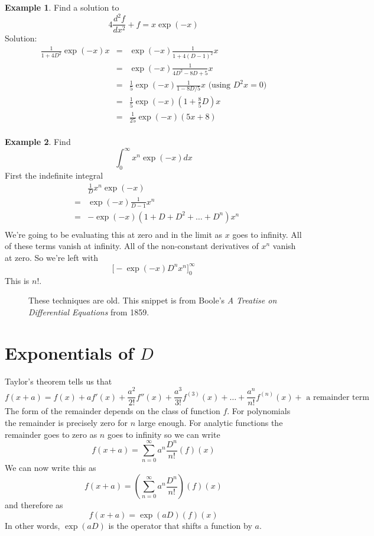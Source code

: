 \documentclass[a4paper]{article}
\theoremstyle{definition}
\newtheorem{example}{Example}[section]
\begin{document}
\begin{example}
Find a solution to
\[
4\frac{d^2f}{dx^2}+f = x\exp(-x)
\]
Solution:
\begin{eqnarray*}
\frac{1}{1+4D^2}\exp(-x)x & = & \exp(-x)\frac{1}{1+4(D-1)^2}x \\
& = & \exp(-x)\frac{1}{4D^2-8D+5}x \\
& = & \frac{1}{5}\exp(-x)\frac{1}{1-8D/5}x \mbox{ (using $D^2x=0$)}\\
& = & \frac{1}{5}\exp(-x)(1+\frac{8}{5}D)x \\
& = & \frac{1}{25}\exp(-x)(5x+8) \\
\end{eqnarray*}

\end{example}

\begin{example}
Find
\[
\int_0^\infty x^n\exp(-x)dx
\]
First the indefinite integral
\begin{eqnarray*}
&   & \frac{1}{D}x^n\exp(-x) \\
& = & \exp(-x)\frac{1}{D-1}x^n \\
& = & -\exp(-x)(1+D+D^2+\ldots+D^n)x^n \\
\end{eqnarray*}
We're going to be evaluating this at zero and in the limit as $x$ goes to infinity.
All of these terms vanish at infinity.
All of the non-constant derivatives of $x^n$ vanish at zero.
So we're left with
\[
\Big[-\exp(-x)D^nx^n\Big]_0^\infty
\]
This is $n!$.
\end{example}

\begin{figure}
\centering
{}
\caption{These techniques are old. This snippet is from Boole's \emph{A Treatise on Differential Equations} from 1859.}
\end{figure}

\section{Exponentials of $D$}
Taylor's theorem tells us that
\[
f(x+a) = f(x)+af'(x)+\frac{a^2}{2!}f''(x)+\frac{a^3}{3!}f^{(3)}(x)+\ldots+\frac{a^n}{n!}f^{(n)}(x)+\mbox{ a remainder term}
\]
The form of the remainder depends on the class of function $f$.
For polynomials the remainder is precisely zero for $n$ large enough.
For analytic functions the remainder goes to zero as $n$ goes to infinity so we can write
\[
f(x+a) = \sum_{n=0}^\infty a^n\frac{D^n}{n!}(f)(x)
\]
We can now write this as
\[
f(x+a) = (\sum_{n=0}^\infty a^n\frac{D^n}{n!})(f)(x)
\]
and therefore as
\[
f(x+a) = \exp(aD)(f)(x)
\]
In other words, $\exp(aD)$ is the operator that shifts a function by $a$.
\end{document}
